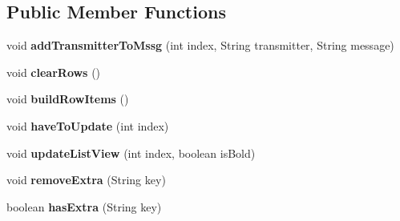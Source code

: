 \subsection*{Public Member Functions}
\begin{DoxyCompactItemize}
\item 
void {\bfseries add\+Transmitter\+To\+Mssg} (int index, String transmitter, String message)\hypertarget{interfacecom_1_1example_1_1sebastian_1_1tindertp_1_1Interfaces_1_1ViewUpdater_a0b95827e5b6be2dc5f27ce0bb2bfe11d}{}\label{interfacecom_1_1example_1_1sebastian_1_1tindertp_1_1Interfaces_1_1ViewUpdater_a0b95827e5b6be2dc5f27ce0bb2bfe11d}

\item 
void {\bfseries clear\+Rows} ()\hypertarget{interfacecom_1_1example_1_1sebastian_1_1tindertp_1_1Interfaces_1_1ViewUpdater_aae4df9cc687f4ac19abc47a07a545818}{}\label{interfacecom_1_1example_1_1sebastian_1_1tindertp_1_1Interfaces_1_1ViewUpdater_aae4df9cc687f4ac19abc47a07a545818}

\item 
void {\bfseries build\+Row\+Items} ()\hypertarget{interfacecom_1_1example_1_1sebastian_1_1tindertp_1_1Interfaces_1_1ViewUpdater_a32e7a1b156d19c2d935a750a040c2933}{}\label{interfacecom_1_1example_1_1sebastian_1_1tindertp_1_1Interfaces_1_1ViewUpdater_a32e7a1b156d19c2d935a750a040c2933}

\item 
void {\bfseries have\+To\+Update} (int index)\hypertarget{interfacecom_1_1example_1_1sebastian_1_1tindertp_1_1Interfaces_1_1ViewUpdater_a3f85b938336a038a967665ed40a3cfac}{}\label{interfacecom_1_1example_1_1sebastian_1_1tindertp_1_1Interfaces_1_1ViewUpdater_a3f85b938336a038a967665ed40a3cfac}

\item 
void {\bfseries update\+List\+View} (int index, boolean is\+Bold)\hypertarget{interfacecom_1_1example_1_1sebastian_1_1tindertp_1_1Interfaces_1_1ViewUpdater_abae72ccfaced8761448bc4bef43a35d4}{}\label{interfacecom_1_1example_1_1sebastian_1_1tindertp_1_1Interfaces_1_1ViewUpdater_abae72ccfaced8761448bc4bef43a35d4}

\item 
void {\bfseries remove\+Extra} (String key)\hypertarget{interfacecom_1_1example_1_1sebastian_1_1tindertp_1_1Interfaces_1_1ViewUpdater_a44685a5409bd5cbb95a1fbd69b96231a}{}\label{interfacecom_1_1example_1_1sebastian_1_1tindertp_1_1Interfaces_1_1ViewUpdater_a44685a5409bd5cbb95a1fbd69b96231a}

\item 
boolean {\bfseries has\+Extra} (String key)\hypertarget{interfacecom_1_1example_1_1sebastian_1_1tindertp_1_1Interfaces_1_1ViewUpdater_a35b07827240d2d15a9ee41e94fb06c87}{}\label{interfacecom_1_1example_1_1sebastian_1_1tindertp_1_1Interfaces_1_1ViewUpdater_a35b07827240d2d15a9ee41e94fb06c87}


\end{DoxyCompactItemize}
